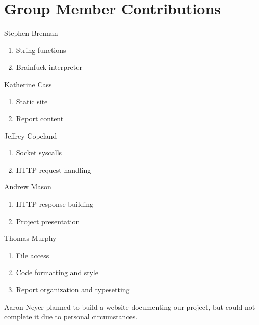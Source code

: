 \documentclass[journal,10pt]{IEEEtran}
\begin{document}
\section{Group Member Contributions}

\begin{LaTeXitemize} \itemsep0pt \parskip0pt
  \item Stephen Brennan
  \begin{enumerate}
    \item String functions
    \item Brainfuck interpreter
  \end{enumerate}

  \item Katherine Cass
  \begin{enumerate}
    \item Static site
    \item Report content
  \end{enumerate}

  \item Jeffrey Copeland
  \begin{enumerate}
    \item Socket syscalls
    \item HTTP request handling
  \end{enumerate}

  \item Andrew Mason
  \begin{enumerate}
    \item HTTP response building
    \item Project presentation
  \end{enumerate}

  \item Thomas Murphy
  \begin{enumerate}
    \item File access
    \item Code formatting and style
    \item Report organization and typesetting
  \end{enumerate}

\end{LaTeXitemize}

Aaron Neyer planned to build a website documenting our project, but could not
complete it due to personal circumstances.
\end{document}
